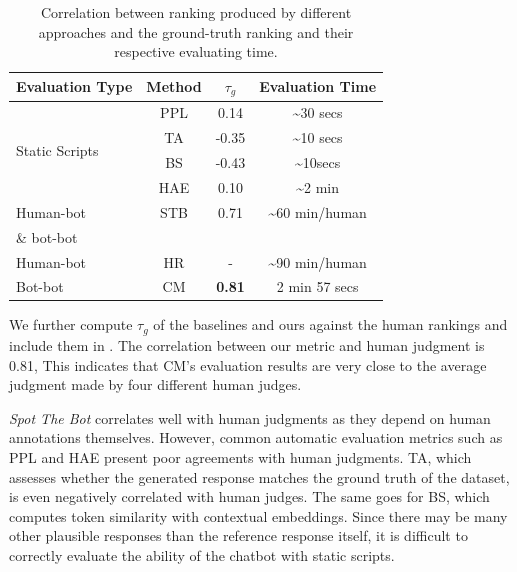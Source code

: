 \begin{table}[th]
\centering
\small
\begin{tabular}{lccc}
\toprule
Evaluation Type & Method & $\tau_{g}$ & Evaluation Time \\ \midrule
\multirow{4}{*}{Static Scripts}&PPL  &0.14 & \textasciitilde 30 secs \\
&TA&-0.35 & \textasciitilde 10 secs \\
&BS& -0.43 & \textasciitilde 10secs\\
&HAE&0.10 &\textasciitilde 2 min\\  \midrule
Human-bot  &STB &0.71 & \textasciitilde 60 min/human\\ 
\& bot-bot & & & \\
\midrule
Human-bot &HR &-  & \textasciitilde 90 min/human \\  \midrule
Bot-bot &CM& \textbf{0.81} & 2 min 57 secs\\
 \bottomrule
\end{tabular}
\caption{Correlation between ranking produced by different approaches and the ground-truth ranking 
and their respective evaluating time.}
\label{tab:main}
\end{table}

We further compute $\tau_g$ of the baselines and 
ours against the human rankings and include them in . 
The correlation between our metric and human judgment is 0.81,
This indicates that CM's evaluation results 
are very close to the average 
judgment made by four different human judges. 

\textit{Spot The Bot} correlates well with human judgments as they
depend on human annotations themselves. 
However, common automatic evaluation metrics such as PPL and HAE 
present poor agreements with human judgments. 
TA, which assesses whether the 
generated response matches the ground truth
of the dataset, is even negatively correlated with human judges. 
The same goes for BS, 
which computes token similarity with contextual embeddings.
Since there may be many other plausible responses than
the reference response itself, it is difficult to correctly evaluate 
the ability of the chatbot with static scripts.

